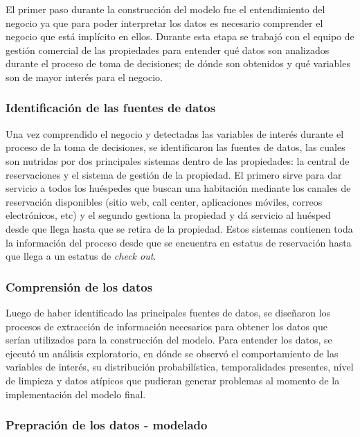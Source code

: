 El primer paso durante la construcción del modelo fue el entendimiento del negocio ya que para poder interpretar los datos es necesario comprender el negocio que está implícito en ellos. Durante esta etapa se trabajó con el equipo de gestión comercial de las propiedades para entender qué datos son analizados durante el proceso de toma de decisiones; de dónde son obtenidos y qué variables son de mayor interés para el negocio.

\subsubsection*{Identificación de las fuentes de datos}

Una vez comprendido el negocio y detectadas las variables de interés durante el proceso de la toma de decisiones, se identificaron las fuentes de datos, las cuales son nutridas por dos principales sistemas dentro de las propiedades: la central de reservaciones y el sistema de gestión de la propiedad. El primero sirve para dar servicio a todos los huéspedes que buscan una habitación mediante los canales de reservación disponibles (sitio web, call center, aplicaciones móviles, correos electrónicos, etc) y el segundo gestiona la propiedad y dá servicio al huésped desde que llega hasta que se retira de la propiedad. Estos sistemas contienen toda la información del proceso desde que se encuentra en estatus de reservación hasta que llega a un estatus de \emph{check out}.

\subsubsection*{Comprensión de los datos}

Luego de haber identificado las principales fuentes de datos, se diseñaron los procesos de extracción de información necesarios para obtener los datos que serían utilizados para la construcción del modelo. Para entender los datos, se ejecutó un análisis exploratorio, en dónde se observó el comportamiento de las variables de interés, su distribución probabilística, temporalidades presentes, nível de limpieza y datos atípicos que pudieran generar problemas al momento de la implementación del modelo final.

\subsubsection*{Prepración de los datos - modelado}

